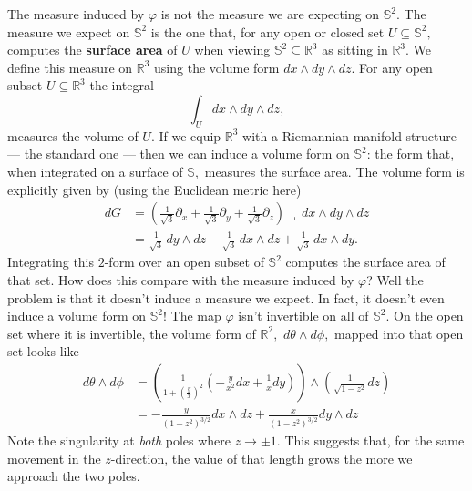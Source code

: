 The measure induced by \(\varphi\) is not the measure we are expecting on \(\mathbb{S}^2.\)
The measure we expect on \(\mathbb{S}^2\) is the one that, for any open or closed set \(U \subseteq \mathbb{S}^2,\) computes the \textbf{surface area} of \(U\) when viewing \(\mathbb{S}^2 \subseteq \mathbb{R}^3\) as sitting in \(\mathbb{R}^3.\)
We define this measure on \(\mathbb{R}^3\) using the volume form \(dx \wedge dy \wedge dz.\)
For any open subset \(U \subseteq \mathbb{R}^3\) the integral
\[
  \int_{U} dx \wedge dy \wedge dz,
\]
measures the volume of \(U.\)
If we equip \(\mathbb{R}^3\) with a Riemannian manifold structure --- the standard one --- then we can induce a volume form on \(\mathbb{S}^2\):
the form that, when integrated on a surface of \(\mathbb{S},\) measures the surface area.
The volume form is explicitly given by (using the Euclidean metric here)
\[
\begin{aligned}
  dG
    &=
      \left(
      \frac{1}{\sqrt{3}} \partial_x
      +
      \frac{1}{\sqrt{3}} \partial_y
      +
      \frac{1}{\sqrt{3}} \partial_z
      \right)
      \,\lrcorner\,
      dx \wedge dy \wedge dz\\
    &=
      \frac{1}{\sqrt{3}} \, dy \wedge dz
      -
      \frac{1}{\sqrt{3}} \, dx \wedge dz
      +
      \frac{1}{\sqrt{3}} \, dx \wedge dy.
\end{aligned}
\]
Integrating this \(2\)-form over an open subset of \(\mathbb{S}^2\) computes the surface area of that set.
How does this compare with the measure induced by \(\varphi\)?
Well the problem is that it doesn't induce a measure we expect.
In fact, it doesn't even induce a volume form on \(\mathbb{S}^2\)!
The map \(\varphi\) isn't invertible on all of \(\mathbb{S}^2.\)
On the open set where it is invertible, the volume form of \(\mathbb{R}^2,\) \(d\theta \wedge d\phi,\) mapped into that open set looks like
\[
\begin{aligned}
  d\theta \wedge d\phi
    &=
      \left(
        \frac{1}{1 + \left(\frac{y}{x}\right)^2} \left(
          -\frac{y}{x^2} dx
          +
          \frac{1}{x} dy
        \right)
      \right)
      \wedge
      \left(
        \frac{1}{\sqrt{1 - z^2}} dz
      \right)\\
    &=
      -\frac{y}{(1 - z^2)^{3/2}} dx \wedge dz
      +
      \frac{x}{(1 - z^2)^{3/2}} dy \wedge dz
\end{aligned}
\]
Note the singularity at \emph{both} poles where \(z \to \pm 1.\)
This suggests that, for the same movement in the \(z\)-direction, the value of that length grows the more we approach the two poles.

